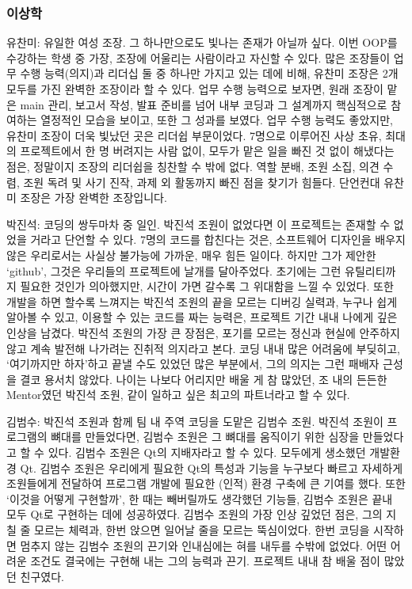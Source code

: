 \documentclass[10pt,oneside,a4paper,titlepage]{article}
\begin{document}
\subsubsection{이상학}

유찬미: 유일한 여성 조장. 그 하나만으로도 빛나는 존재가 아닐까 싶다. 이번 OOP를 수강하는 학생 중 가장, 조장에 어울리는 사람이라고 자신할 수 있다. 많은 조장들이 업무 수행 능력(의지)과 리더십 둘 중 하나만 가지고 있는 데에 비해, 유찬미 조장은 2개 모두를 가진 완벽한 조장이라 할 수 있다. 업무 수행 능력으로 보자면, 원래 조장이 맡은 main 관리, 보고서 작성, 발표 준비를 넘어 내부 코딩과 그 설계까지 핵심적으로 참여하는 열정적인 모습을 보이고, 또한 그 성과를 보였다. 
업무 수행 능력도 좋았지만, 유찬미 조장이 더욱 빛났던 곳은 리더쉽 부문이었다. 7명으로 이루어진 사상 초유, 최대의 프로젝트에서 한 명 버려지는 사람 없이, 모두가 맡은 일을 빠진 것 없이 해냈다는 점은, 정말이지 조장의 리더쉽을 칭찬할 수 밖에 없다. 역할 분배, 조원 소집, 의견 수렴, 조원 독려 및 사기 진작, 과제 외 활동까지 빠진 점을 찾기가 힘들다. 단언컨대 유찬미 조장은 가장 완벽한 조장입니다.

박진석: 코딩의 쌍두마차 중 일인. 박진석 조원이 없었다면 이 프로젝트는 존재할 수 없었을 거라고 단언할 수 있다.  7명의 코드를 합친다는 것은, 소프트웨어 디자인을 배우지 않은 우리로서는 사실상 불가능에 가까운, 매우 힘든 일이다. 하지만 그가 제안한 ‘github’, 그것은 우리들의 프로젝트에 날개를 달아주었다. 초기에는 그런 유틸리티까지 필요한 것인가 의아했지만, 시간이 가면 갈수록 그 위대함을 느낄 수 있었다. 또한 개발을 하면 할수록 느껴지는 박진석 조원의 끝을 모르는 디버깅 실력과, 누구나 쉽게 알아볼 수 있고, 이용할 수 있는 코드를 짜는 능력은, 프로젝트 기간 내내 나에게 깊은 인상을 남겼다. 
박진석 조원의 가장 큰 장점은, 포기를 모르는 정신과 현실에 안주하지 않고 계속 발전해 나가려는 진취적 의지라고 본다. 코딩 내내 많은 어려움에 부딪히고, ‘여기까지만 하자’하고 끝낼 수도 있었던 많은 부분에서, 그의 의지는 그런 패배자 근성을 결코 용서치 않았다. 나이는 나보다 어리지만 배울 게 참 많았던, 조 내의 든든한 Mentor였던 박진석 조원, 같이 일하고 싶은 최고의 파트너라고 할 수 있다. 

김범수: 박진석 조원과 함께 팀 내 주역 코딩을 도맡은 김범수 조원. 박진석 조원이 프로그램의 뼈대를 만들었다면, 김범수 조원은 그 뼈대를 움직이기 위한 심장을 만들었다고 할 수 있다. 김범수 조원은 Qt의 지배자라고 할 수 있다. 모두에게 생소했던 개발환경 Qt. 김범수 조원은 우리에게 필요한 Qt의 특성과 기능을 누구보다 빠르고 자세하게 조원들에게 전달하여 프로그램 개발에 필요한 (인적) 환경 구축에 큰 기여를 했다. 또한 ‘이것을 어떻게 구현할까’, 한 때는 빼버릴까도 생각했던 기능들, 김범수 조원은 끝내 모두 Qt로 구현하는 데에 성공하였다.
김범수 조원의 가장 인상 깊었던 점은, 그의 지칠 줄 모르는 체력과, 한번 앉으면 일어날 줄을 모르는 뚝심이었다. 한번 코딩을 시작하면 멈추지 않는 김범수 조원의 끈기와 인내심에는 혀를 내두를 수밖에 없었다. 어떤 어려운 조건도 결국에는 구현해 내는 그의 능력과 끈기. 프로젝트 내내 참 배울 점이 많았던 친구였다.
\end{document}
